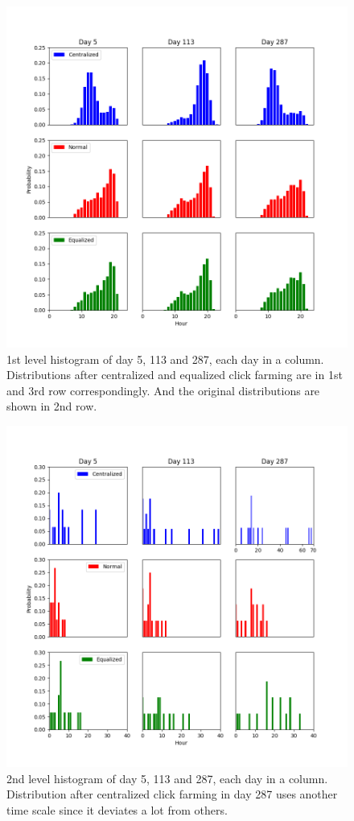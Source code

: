 \documentclass[10pt,conference,letterpaper]{IEEEtran}
\begin{document}
			\begin{figure}[!ht]
				\centering
				\includegraphics[width=\linewidth]{fig/Raw1stLevelHist.png}
				\caption{1st level histogram of day 5, 113 and 287, each day in a column. Distributions after centralized and equalized click farming are in 1st and 3rd row correspondingly. And the original distributions are shown in 2nd row.}
				\label{fig:raw-hist-1st}
			\end{figure}
			
			\begin{figure}[!ht]
				\centering
				\includegraphics[width=\linewidth]{fig/Raw2ndLevelHist}
				\caption{2nd level histogram of day 5, 113 and 287, each day in a column. Distribution after centralized click farming in day 287 uses another time scale since it deviates a lot from others.}
				\label{fig:raw-hist-2nd}
			\end{figure}
	
\end{document}

